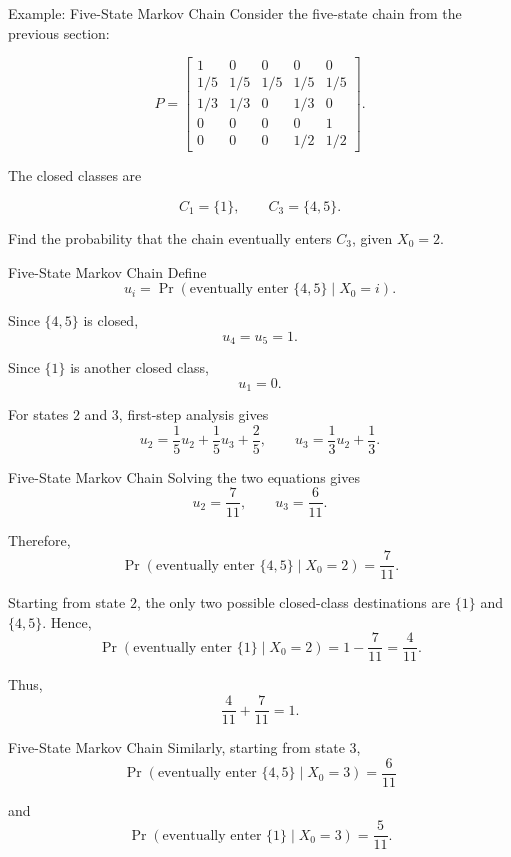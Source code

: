 \documentclass[
  ignorenonframetext,
  aspectratio=169,
]{beamer}
\begin{document}
\begin{frame}{Example: Five-State Markov Chain}
\protect{}\label{example-five-state-markov-chain}
Consider the five-state chain from the previous section:

\[
P=
\begin{bmatrix}
1&0&0&0&0\\
1/5&1/5&1/5&1/5&1/5\\
1/3&1/3&0&1/3&0\\
0&0&0&0&1\\
0&0&0&1/2&1/2
\end{bmatrix}.
\]

The closed classes are

\[
C_1=\{1\},
\qquad
C_3=\{4,5\}.
\]

Find the probability that the chain eventually enters \(C_3\), given
\(X_0=2\).
\end{frame}

\begin{frame}{Five-State Markov Chain}
\protect{}\label{five-state-markov-chain}
Define \[
u_i=\Pr(\text{eventually enter }\{4,5\}\mid X_0=i).
\]

Since \(\{4,5\}\) is closed, \[
u_4=u_5=1.
\]

Since \(\{1\}\) is another closed class, \[
u_1=0.
\]

For states \(2\) and \(3\), first-step analysis gives \[
u_2=\frac15u_2+\frac15u_3+\frac25,
\qquad
u_3=\frac13u_2+\frac13.
\]
\end{frame}

\begin{frame}{Five-State Markov Chain}
\protect{}\label{five-state-markov-chain-1}
Solving the two equations gives \[
\boxed{u_2=\frac7{11}},
\qquad
\boxed{u_3=\frac6{11}}.
\]

Therefore, \[
\boxed{
\Pr(\text{eventually enter }\{4,5\}\mid X_0=2)=\frac7{11}.
}
\]

Starting from state \(2\), the only two possible closed-class
destinations are \(\{1\}\) and \(\{4,5\}\). Hence, \[
\Pr(\text{eventually enter }\{1\}\mid X_0=2)
=1-\frac7{11}
=\frac4{11}.
\]

Thus, \[
\boxed{\frac4{11}+\frac7{11}=1.}
\]
\end{frame}

\begin{frame}{Five-State Markov Chain}
\protect{}\label{five-state-markov-chain-2}
Similarly, starting from state \(3\), \[
\boxed{
\Pr(\text{eventually enter }\{4,5\}\mid X_0=3)=\frac6{11}
}
\]

and \[
\boxed{
\Pr(\text{eventually enter }\{1\}\mid X_0=3)=\frac5{11}.
}
\]
\end{frame}
\end{document}
